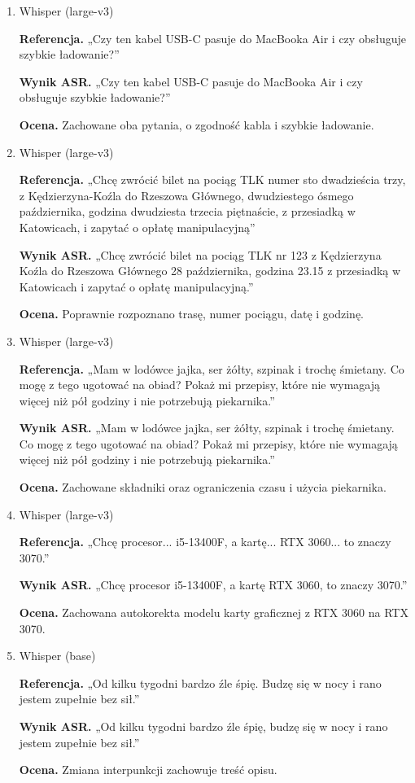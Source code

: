 \documentclass{article}
\begin{document}
\begin{enumerate}
    \item Whisper (large-v3)
    \par\textbf{Referencja.} „Czy ten kabel USB-C pasuje do MacBooka Air i czy obsługuje szybkie ładowanie?”
    \par\textbf{Wynik ASR.} „Czy ten kabel USB-C pasuje do MacBooka Air i czy obsługuje szybkie ładowanie?”
    \par\textbf{Ocena.} Zachowane oba pytania, o zgodność kabla i szybkie ładowanie.

    \item Whisper (large-v3)
    \par\textbf{Referencja.} „Chcę zwrócić bilet na pociąg TLK numer sto dwadzieścia trzy, z Kędzierzyna-Koźla do Rzeszowa Głównego, dwudziestego ósmego października, godzina dwudziesta trzecia piętnaście, z przesiadką w Katowicach, i zapytać o opłatę manipulacyjną”
    \par\textbf{Wynik ASR.} „Chcę zwrócić bilet na pociąg TLK nr 123 z Kędzierzyna Koźla do Rzeszowa Głównego 28 października, godzina 23.15 z przesiadką w Katowicach i zapytać o opłatę manipulacyjną.”
    \par\textbf{Ocena.} Poprawnie rozpoznano trasę, numer pociągu, datę i godzinę.

    \item Whisper (large-v3)
    \par\textbf{Referencja.} „Mam w lodówce jajka, ser żółty, szpinak i trochę śmietany. Co mogę z tego ugotować na obiad? Pokaż mi przepisy, które nie wymagają więcej niż pół godziny i nie potrzebują piekarnika.”
    \par\textbf{Wynik ASR.} „Mam w lodówce jajka, ser żółty, szpinak i trochę śmietany. Co mogę z tego ugotować na obiad? Pokaż mi przepisy, które nie wymagają więcej niż pół godziny i nie potrzebują piekarnika.”
    \par\textbf{Ocena.} Zachowane składniki oraz ograniczenia czasu i użycia piekarnika.

    \item Whisper (large-v3)
    \par\textbf{Referencja.} „Chcę procesor... i5-13400F, a kartę... RTX 3060... to znaczy 3070.”
    \par\textbf{Wynik ASR.} „Chcę procesor i5-13400F, a kartę RTX 3060, to znaczy 3070.”
    \par\textbf{Ocena.} Zachowana autokorekta modelu karty graficznej z RTX 3060 na RTX 3070.

    \item Whisper (base)
    \par\textbf{Referencja.} „Od kilku tygodni bardzo źle śpię. Budzę się w nocy i rano jestem zupełnie bez sił.”
    \par\textbf{Wynik ASR.} „Od kilku tygodni bardzo źle śpię, budzę się w nocy i rano jestem zupełnie bez sił.”
    \par\textbf{Ocena.} Zmiana interpunkcji zachowuje treść opisu.

\end{enumerate}
\end{document}
